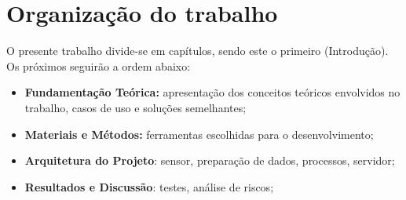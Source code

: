 \section{Organização do trabalho}
O presente trabalho divide-se em capítulos, sendo este o primeiro (Introdução). Os próximos seguirão a ordem abaixo:

\begin{itemize}
  \item \textbf{Fundamentação Teórica:} apresentação dos conceitos teóricos envolvidos no trabalho, casos de uso e soluções semelhantes;
  \item \textbf{Materiais e Métodos:} ferramentas escolhidas para o desenvolvimento;
  \item \textbf{Arquitetura do Projeto}: sensor, preparação de dados, processos, servidor;
	\item \textbf{Resultados e Discussão}: testes, análise de riscos; 
\end{itemize}
